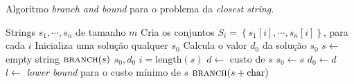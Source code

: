 \begin{algorithm}[H]
    \caption{Algoritmo \textit{branch and bound} para o problema da \textit{closest string}.}
    \label{alg:tree}
    \begin{algorithmic}
        \Require Strings $s_1, \cdots, s_n$ de tamanho $m$
        \State Cria os conjuntos $S_i = \left\{s_1[i], \cdots, s_n[i]\right\}$, para cada $i$
        \State Inicializa uma solução qualquer $s_0$
        \State Calcula o valor $d_0$ da solução $s_0$
        \State $s \gets$ empty string
        \State $\textsc{branch}(s)$        
        \State \Return $s_0, d_0$
        \State
            \State $i = \text{length}(s)$
                \State $d \gets$ custo de $s$
                    \State $s_0 \gets s$
                    \State $d_0 \gets d$
                \EndIf
                \State \Return
            \EndIf
            \State $l \gets$ \textit{lower bound} para o custo mínimo de $s$ 
                \State \Return
            \EndIf
                \State $\textsc{branch}(s + \text{char})$ 
            \EndFor
        \EndProcedure
    \end{algorithmic}
\end{algorithm}
